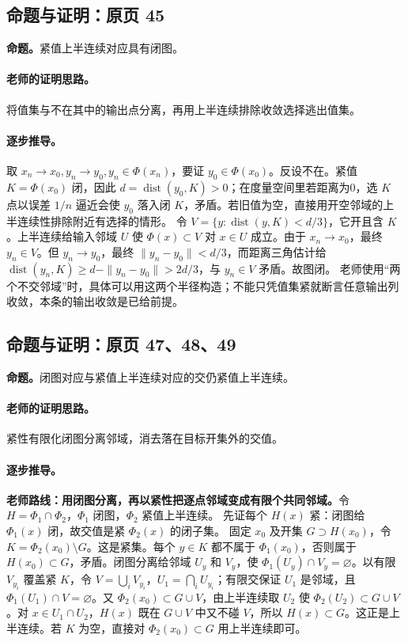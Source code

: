 \subsection{命题与证明：原页 45}

\textbf{命题。}紧值上半连续对应具有闭图。

\paragraph{老师的证明思路。}将值集与不在其中的输出点分离，再用上半连续排除收敛选择逃出值集。

\paragraph{逐步推导。}
取 $x_n\to x_0,y_n\to y_0,y_n\in\Phi(x_n)$，要证 $y_0\in\Phi(x_0)$。反设不在。紧值 $K=\Phi(x_0)$ 闭，因此 $d=\operatorname{dist}(y_0,K)>0$；在度量空间里若距离为0，选 $K$ 点以误差 $1/n$ 逼近会使 $y_0$ 落入闭 $K$，矛盾。若旧值为空，直接用开空邻域的上半连续性排除附近有选择的情形。
令 $V=\{y:\operatorname{dist}(y,K)<d/3\}$，它开且含 $K$。上半连续给输入邻域 $U$ 使 $\Phi(x)\subset V$ 对 $x\in U$ 成立。由于 $x_n\to x_0$，最终 $y_n\in V$。但 $y_n\to y_0$，最终 $\|y_n-y_0\|<d/3$，而距离三角估计给 $\operatorname{dist}(y_n,K)\ge d-\|y_n-y_0\|>2d/3$，与 $y_n\in V$ 矛盾。故图闭。
老师使用“两个不交邻域”时，具体可以用这两个半径构造；不能只凭值集紧就断言任意输出列收敛，本条的输出收敛是已给前提。


\subsection{命题与证明：原页 47、48、49}

\textbf{命题。}闭图对应与紧值上半连续对应的交仍紧值上半连续。

\paragraph{老师的证明思路。}紧性有限化闭图分离邻域，消去落在目标开集外的交值。

\paragraph{逐步推导。}\textbf{老师路线：用闭图分离，再以紧性把逐点邻域变成有限个共同邻域。}令 $H=\Phi_1\cap\Phi_2$，$\Phi_1$ 闭图，$\Phi_2$ 紧值上半连续。
先证每个 $H(x)$ 紧：闭图给 $\Phi_1(x)$ 闭，故交值是紧 $\Phi_2(x)$ 的闭子集。
固定 $x_0$ 及开集 $G\supset H(x_0)$，令 $K=\Phi_2(x_0)\setminus G$。这是紧集。每个 $y\in K$ 都不属于 $\Phi_1(x_0)$，否则属于 $H(x_0)\subset G$，矛盾。闭图分离给邻域 $U_y$ 和 $V_y$，使 $\Phi_1(U_y)\cap V_y=\varnothing$。以有限 $V_{y_i}$ 覆盖紧 $K$，令 $V=\bigcup_i V_{y_i}$，$U_1=\bigcap_iU_{y_i}$；有限交保证 $U_1$ 是邻域，且 $\Phi_1(U_1)\cap V=\varnothing$。又 $\Phi_2(x_0)\subset G\cup V$，由上半连续取 $U_2$ 使 $\Phi_2(U_2)\subset G\cup V$。对 $x\in U_1\cap U_2$，$H(x)$ 既在 $G\cup V$ 中又不碰 $V$，所以 $H(x)\subset G$。这正是上半连续。若 $K$ 为空，直接对 $\Phi_2(x_0)\subset G$ 用上半连续即可。


